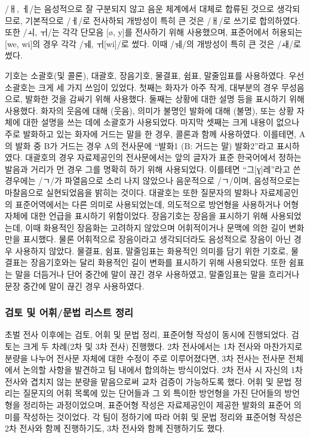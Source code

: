 /ㅐ, ㅔ/는 음성적으로 잘 구분되지 않고 음운 체계에서 대체로 합류된 것으로 생각되므로, 기본적으로 /ㅔ/로 전사하되 개방성이 특히 큰 것은 /ㅐ/로 쓰기로 합의하였다. 또한 /ㅚ, ㅟ/는 각각 단모음 [ø, y]를 전사하기 위해 사용했으며, 표준어에서 허용되는 [we, wi]의 경우 각각 /ㅞ, ㅟ[wi]/로 썼다. 이때 /ㅞ/의 개방성이 특히 큰 것은 /ㅙ/로 썼다.

기호는 소괄호(및 콜론), 대괄호, 장음기호, 물결표, 쉼표, 말줄임표를 사용하였다. 우선 소괄호는 크게 세 가지 쓰임이 있었다. 첫째는 화자가 아주 작게, 대부분의 경우 무성음으로, 발화한 것을 감싸기 위해 사용했다. 둘째는 상황에 대한 설명 등을 표시하기 위해 사용했다. 화자의 웃음에 대해 (웃음), 의미가 불명인 발화에 대해 (불명), 또는 상황 자체에 대한 설명을 쓰는 데에 소괄호가 사용되었다. 마지막 셋째는 크게 내용이 없으나 주로 발화하고 있는 화자에 거드는 말을 한 경우, 콜론과 함께 사용하였다. 이를테면, A의 발화 중 B가 거드는 경우 A의 전사문에 ``발화1 (B: 거드는 말) 발화2''라고 표시하였다. 대괄호의 경우 자료제공인의 전사문에서는 앞의 글자가 표준 한국어에서 정하는 발음과 거리가 먼 경우 그를 명확히 하기 위해 사용되었다. 이를테면 ``그[ɣ]레''라고 쓴 경우에는 /ㄱ/가 파열음으로 소리 나지 않았으나 음운적으로 /ㄱ/이며, 음성적으로는 마찰음으로 실현되었음을 밝히는 것이다. 대괄호는 또한 질문자의 발화나 자료제공인의 표준어역에서는 다른 의미로 사용되었는데, 의도적으로 방언형을 사용하거나 어형 자체에 대한 언급을 표시하기 위함이었다. 장음기호는 장음을 표시하기 위해 사용되었는데, 이때 화용적인 장음화는 고려하지 않았으며 어휘적이거나 문맥에 의한 길이 변화만을 표시했다. 물론 어휘적으로 장음이라고 생각되더라도 음성적으로 장음이 아닌 경우 사용하지 않았다. 물결표, 쉼표, 말줄임표는 화용적인 의미를 담기 위한 기호로, 물결표는 장음기호와는 달리 화용적인 길이 변화를 표시하기 위해 사용되었다. 또한 쉼표는 말을 더듬거나 단어 중간에 말이 끊긴 경우 사용하였고, 말줄임표는 말을 흐리거나 문장 중간에 말이 끊긴 경우 사용하였다.

\subsubsection{검토 및 어휘/문법 리스트 정리}
초벌 전사 이후에는 검토, 어휘 및 문법 정리, 표준어형 작성이 동시에 진행되었다. 검토는 크게 두 차례(2차 및 3차 전사) 진행했다. 2차 전사에서는 1차 전사와 마찬가지로 분량을 나누어 전사문 자체에 대한 수정이 주로 이루어졌다면, 3차 전사는 전사문 전체에서 논의할 사항을 발견하고 팀 내에서 합의하는 방식이었다. 2차 전사 시 자신의 1차 전사와 겹치지 않는 분량을 맡음으로써 교차 검증이 가능하도록 했다. 어휘 및 문법 정리는 질문지의 어휘 목록에 있는 단어들과 그 외 특이한 방언형을 가진 단어들의 방언형을 정리하는 과정이었으며, 표준어형 작성은 자료제공인이 제공한 발화의 표준어 의미를 작성하는 것이었다. 각 팀이 정하기에 따라 어휘 및 문법 정리와 표준어형 작성은 2차 전사와 함께 진행하기도, 3차 전사와 함께 진행하기도 했다.

